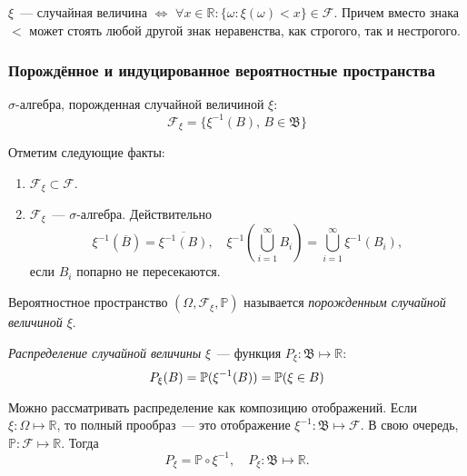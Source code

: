 \begin{crlr}
    $\xi$~--- случайная величина $\Leftrightarrow$ $\forall x \in \mathbb{R} \colon \{\omega \colon \xi(\omega) < x \} \in \mathcal{F}$. Причем вместо знака $<$ может стоять любой другой знак неравенства, как строгого, так и нестрогого.
\end{crlr}

\subsubsection{Порождённое и индуцированное вероятностные пространства}
\begin{defn}
    $\sigma\text{-алгебра}$, порожденная случайной величиной $\xi$:
    \begin{equation*}
        \mathcal{F}_\xi = \{\xi^{-1}(B), \, B \in \mathfrak{B} \}
    \end{equation*}
\end{defn}

Отметим следующие факты:
\begin{enumerate}
    \item $\mathcal{F}_\xi \subset \mathcal{F}.$
    \item $\mathcal{F}_\xi$~--- ${\sigma \text{-алгебра}}$. Действительно
    \begin{equation*}
        \xi^{-1}(\overline{B}) = \overline{\xi^{-1}(B)}, \quad
        \xi^{-1}\left(\bigcup\limits_{i=1}^{\infty}B_i\right) = \bigcup\limits_{i=1}^\infty \xi^{-1}(B_i),
    \end{equation*}
   если $B_i$ попарно не пересекаются.
\end{enumerate}

\begin{defn}
    Вероятностное пространство $(\Omega,\mathcal{F}_\xi,\mathbb{P})$ называется {\it порожденным случайной величиной $\xi$}.
\end{defn}

\begin{defn}
    {\it Распределение случайной величины} $\xi$~--- функция ${P_\xi: \mathfrak{B} \mapsto \mathbb{R}}$:
    \begin{equation*}
        P_\xi(B) = {\mathbb{P}(\xi^{-1}(B))} = {\mathbb{P}(\xi \in B)}
    \end{equation*}
\end{defn}

\begin{rmrk}
    Можно рассматривать распределение как композицию отображений. Если $\xi: \Omega \mapsto \mathbb{R}$, то полный прообраз~--- это отображение $\xi^{-1}: \mathfrak{B} \mapsto \mathcal{F}$. В свою очередь, $\mathbb{P}: \mathcal{F} \mapsto \mathbb{R}$. Тогда
    \begin{equation*}
        P_{\xi} = \mathbb{P} \circ \xi^{-1}, \quad P_{\xi}: \mathfrak{B} \mapsto \mathbb{R}.
    \end{equation*}
\end{rmrk}

